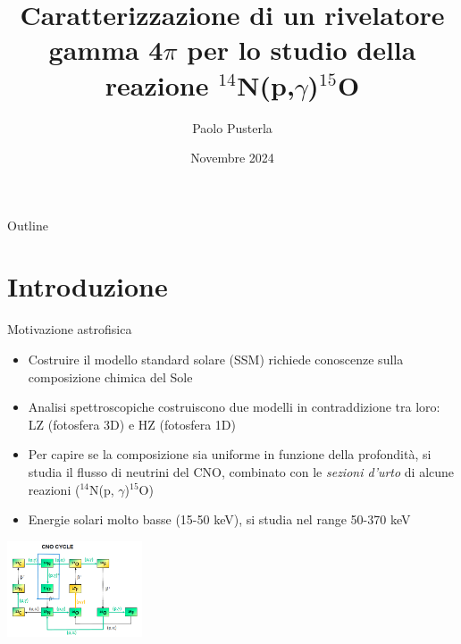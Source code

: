 \documentclass [xcolor=svgnames] {beamer}
\title[Short Title]{Caratterizzazione di un rivelatore gamma 4$\pi$ per lo studio della reazione $^{14}$N(p,$\gamma$)$^{15}$O}
\author[P. Pusterla]{Paolo Pusterla}
\institute[UniTo]{Università degli Studi di Torino}
\date{Novembre 2024}
\begin{document}
	
	\begin{frame}
		\titlepage
	\end{frame}
	
	\begin{frame}{Outline}
		\tableofcontents
	\end{frame}
	

\section{Introduzione}
\begin{frame}{Motivazione astrofisica}
	\begin{itemize}
		\item<1-> Costruire il modello standard solare (SSM) richiede conoscenze sulla composizione chimica del Sole
		\item<2-> Analisi spettroscopiche costruiscono due modelli in contraddizione tra loro: LZ (fotosfera 3D) e HZ (fotosfera 1D)
		\item<3-> Per capire se la composizione sia uniforme in funzione della profondità, si studia il flusso di neutrini del CNO, combinato con le \emph{sezioni d'urto} di alcune reazioni ($^{14}$N(p, $\gamma$)$^{15}$O)
		\item<4-> Energie solari molto basse (15-50 keV), si studia nel range 50-370 keV
	\end{itemize}
	\centering
	\includegraphics[width=0.3\textwidth]{img/CNO_Cycle.png}
\end{frame}
	
\end{document}
